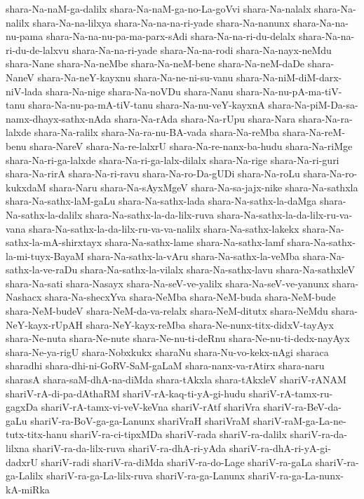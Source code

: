 {shara-Na-naM-ga-dalilx
shara-Na-naM-ga-no-La-goVvi
shara-Na-nalalx
shara-Na-nalilx
shara-Na-na-lilxya
shara-Na-na-na-ri-yade
shara-Na-nanunx
shara-Na-na-nu-pama
shara-Na-na-nu-pa-ma-parx-sAdi
shara-Na-na-ri-du-delalx
shara-Na-na-ri-du-de-lalxvu
shara-Na-na-ri-yade
shara-Na-na-rodi
shara-Na-nayx-neMdu
shara-Nane
shara-Na-neMbe
shara-Na-neM-bene
shara-Na-neM-daDe
shara-NaneV
shara-Na-neY-kayxnu
shara-Na-ne-ni-su-vanu
shara-Na-niM-diM-darx-niV-lada
shara-Na-nige
shara-Na-noVDu
shara-Nanu
shara-Na-nu-pA-ma-tiV-tanu
shara-Na-nu-pa-mA-tiV-tanu
shara-Na-nu-veY-kayxnA
shara-Na-piM-Da-sa-namx-dhayx-sathx-nAda
shara-Na-rAda
shara-Na-rUpu
shara-Nara
shara-Na-ra-lalxde
shara-Na-ralilx
shara-Na-ra-nu-BA-vada
shara-Na-reMba
shara-Na-reM-benu
shara-NareV
shara-Na-re-lalxrU
shara-Na-re-nanx-ba-hudu
shara-Na-riMge
shara-Na-ri-ga-lalxde
shara-Na-ri-ga-lalx-dilalx
shara-Na-rige
shara-Na-ri-guri
shara-Na-rirA
shara-Na-ri-ravu
shara-Na-ro-Da-gUDi
shara-Na-roLu
shara-Na-ro-kukxdaM
shara-Naru
shara-Na-sAyxMgeV
shara-Na-sa-jajx-nike
shara-Na-sathxla
shara-Na-sathx-laM-gaLu
shara-Na-sathx-lada
shara-Na-sathx-la-daMga
shara-Na-sathx-la-dalilx
shara-Na-sathx-la-da-lilx-ruva
shara-Na-sathx-la-da-lilx-ru-va-vana
shara-Na-sathx-la-da-lilx-ru-va-va-nalilx
shara-Na-sathx-lakekx
shara-Na-sathx-la-mA-shirxtayx
shara-Na-sathx-lame
shara-Na-sathx-lamf
shara-Na-sathx-la-mi-tuyx-BayaM
shara-Na-sathx-la-vAru
shara-Na-sathx-la-veMba
shara-Na-sathx-la-ve-raDu
shara-Na-sathx-la-vilalx
shara-Na-sathx-lavu
shara-Na-sathxleV
shara-Na-sati
shara-Nasayx
shara-Na-seV-ve-yalilx
shara-Na-seV-ve-yanunx
shara-Nashacx
shara-Na-shecxYva
shara-NeMba
shara-NeM-buda
shara-NeM-bude
shara-NeM-budeV
shara-NeM-da-va-relalx
shara-NeM-ditutx
shara-NeMdu
shara-NeY-kayx-rUpAH
shara-NeY-kayx-reMba
shara-Ne-nunx-titx-didxV-tayAyx
shara-Ne-nuta
shara-Ne-nute
shara-Ne-nu-ti-deRnu
shara-Ne-nu-ti-dedx-nayAyx
shara-Ne-ya-rigU
shara-Nobxkukx
sharaNu
shara-Nu-vo-kekx-nAgi
sharaca
sharadhi
shara-dhi-ni-GoRV-SaM-gaLaM
shara-nanx-va-rAtirx
shara-naru
sharasA
shara-saM-dhA-na-diMda
shara-tAkxla
shara-tAkxleV
shariV-rANAM
shariV-rA-di-pa-dAthaRM
shariV-rA-kaq-ti-yA-gi-hudu
shariV-rA-tamx-ru-gagxDa
shariV-rA-tamx-vi-veV-keVna
shariV-rAtf
shariVra
shariV-ra-BeV-da-gaLu
shariV-ra-BoV-ga-ga-Lanunx
shariVraH
shariVraM
shariV-raM-ga-La-ne-tutx-titx-hanu
shariV-ra-ci-tipxMDa
shariV-rada
shariV-ra-dalilx
shariV-ra-da-lilxna
shariV-ra-da-lilx-ruva
shariV-ra-dhA-ri-yAda
shariV-ra-dhA-ri-yA-gi-dadxrU
shariV-radi
shariV-ra-diMda
shariV-ra-do-Lage
shariV-ra-gaLa
shariV-ra-ga-Lalilx
shariV-ra-ga-La-lilx-ruva
shariV-ra-ga-Lanunx
shariV-ra-ga-La-nunx-kA-miRka
}
